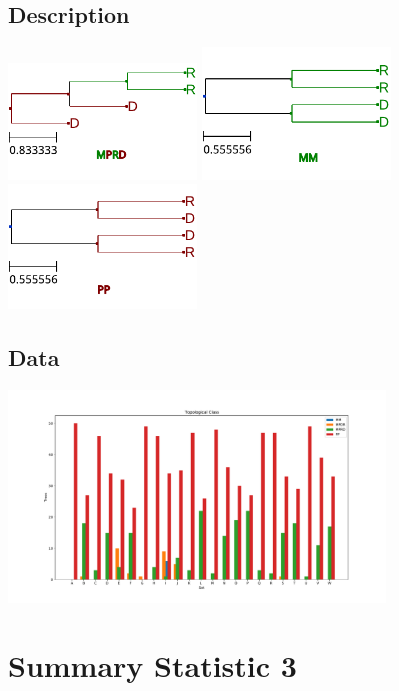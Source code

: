 \documentclass[10pt,aspectratio=169,notheorems,hyperref={pdfauthor=whatever}]{beamer}
\begin{document}
\subsection{Description}
\begin{frame}
  \centering
  \includegraphics[width=5cm, angle=0]{sumstat2example}
  \includegraphics[width=5cm, angle=0]{sumstat2example2}
  \includegraphics[width=5cm, angle=0]{sumstat2example3}
\end{frame}

\subsection{Data}
\begin{frame}
  \centering
  \includegraphics[width=10cm, angle=0]{sumstat2graph}
\end{frame}

\section{Summary Statistic 3}
\end{document}
